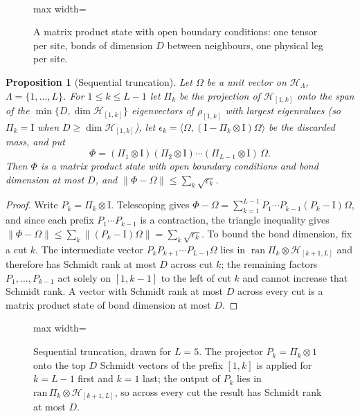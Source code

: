 \documentclass[aps,prx,reprint,superscriptaddress,floatfix,nofootinbib,longbibliography,amsmath,amssymb]{revtex4-2}
\newcommand{\id}{\mathrm{I}}
\newcommand{\norm}[1]{\lVert #1\rVert}
\newcommand{\cH}{\mathcal H}
\newcommand{\Om}{\Omega}
\newcommand{\Lam}{\Lambda}
\theoremstyle{plain}
\newtheorem{proposition}[theorem]{Proposition}
\theoremstyle{definition}
\newcommand{\precisely}{\par\noindent{\bfseries Precisely.}\ }
\begin{document}
\precisely
\begin{figure}[t]
\centering
\begin{adjustbox}{max width=\linewidth}

\end{adjustbox}
\caption{A matrix product state with open boundary conditions: one tensor per site, bonds of dimension $D$ between neighbours, one physical leg per site.}\label{fig:mps-chain}
\end{figure}

\begin{proposition}[Sequential truncation]\label{prop:VC}
Let $\Om$ be a unit vector on $\cH_\Lam$, $\Lam=\{1,\dots,L\}$. For
$1\le k\le L-1$ let $\Pi_k$ be the projection of $\cH_{[1,k]}$ onto the
span of the $\min\{D,\dim\cH_{[1,k]}\}$ eigenvectors of $\rho_{[1,k]}$ with
largest eigenvalues (so $\Pi_k=\id$ when $D\ge\dim\cH_{[1,k]}$), let $\epsilon_k=\langle\Om,(\id-\Pi_k\otimes\id)\Om\rangle$ be the discarded
mass, and put
\[
 \Phi=(\Pi_1\otimes\id)(\Pi_2\otimes\id)\cdots(\Pi_{L-1}\otimes\id)\,\Om .
\]
Then $\Phi$ is a matrix product state with open boundary conditions and
bond dimension at most $D$, and $\norm{\Phi-\Om}\le\sum_k\sqrt{\epsilon_k}$.
\end{proposition}
\begin{proof}
Write $P_k=\Pi_k\otimes\id$. Telescoping gives
$\Phi-\Om=\sum_{k=1}^{L-1}P_1\cdots P_{k-1}(P_k-\id)\Om$, and since each
prefix $P_1\cdots P_{k-1}$ is a contraction, the triangle inequality gives
$\norm{\Phi-\Om}\le\sum_k\norm{(P_k-\id)\Om}=\sum_k\sqrt{\epsilon_k}$. To
bound the bond dimension, fix a cut $k$. The intermediate vector
$P_kP_{k+1}\cdots P_{L-1}\Om$ lies in
$\operatorname{ran}\Pi_k\otimes\cH_{[k+1,L]}$ and therefore has Schmidt rank
at most $D$ across cut $k$; the remaining factors $P_1,\dots,P_{k-1}$ act
solely on $[1,k-1]$ to the left of cut $k$ and cannot increase that Schmidt
rank. A vector with Schmidt rank at most $D$ across every cut is a matrix
product state of bond dimension at most $D$.
\end{proof}

\begin{figure}[t]
\centering
\begin{adjustbox}{max width=\linewidth}

\end{adjustbox}
\caption{Sequential truncation, drawn for $L=5$. The projector $P_k=\Pi_k\otimes 1$ onto the top $D$ Schmidt vectors of the prefix $[1,k]$ is applied for $k=L-1$ first and $k=1$ last; the output of $P_k$ lies in $\mathrm{ran}\,\Pi_k\otimes\mathcal H_{[k+1,L]}$, so across every cut the result has Schmidt rank at most $D$.}\label{fig:truncation-sequence}
\end{figure}
\end{document}
